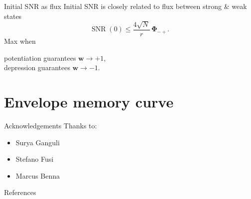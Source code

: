\documentclass{beamer}%
\DeclareMathOperator{\SNR}{SNR}
\newcommand{\w}{\mathbf{w}}
\newcommand{\F}{\boldsymbol{\Phi}}
\begin{document}

\begin{frame}{Initial SNR as flux}
%
 Initial SNR is closely related to flux between strong \& weak states
 \begin{equation*}
   \SNR(0) \leq \frac{4\sqrt{N}}{r}\,\F_{-+}.
 \end{equation*}
 Max when {\parbox[t]{8cm}{potentiation guarantees $\w\to+1$,\\ 
 depression guarantees $\w\to-1$.}}
%
\end{frame}





\section{Envelope memory curve}







%
%
%

\begin{frame}{Acknowledgements}
%
 Thanks to:
 \begin{itemize}
   \item Surya Ganguli
   \item Stefano Fusi
   \item Marcus Benna
 \end{itemize}
%
\end{frame}


\begin{frame}[allowframebreaks]{References}
%

 {\small
 
 
 }
%
\end{frame}


\end{document}

